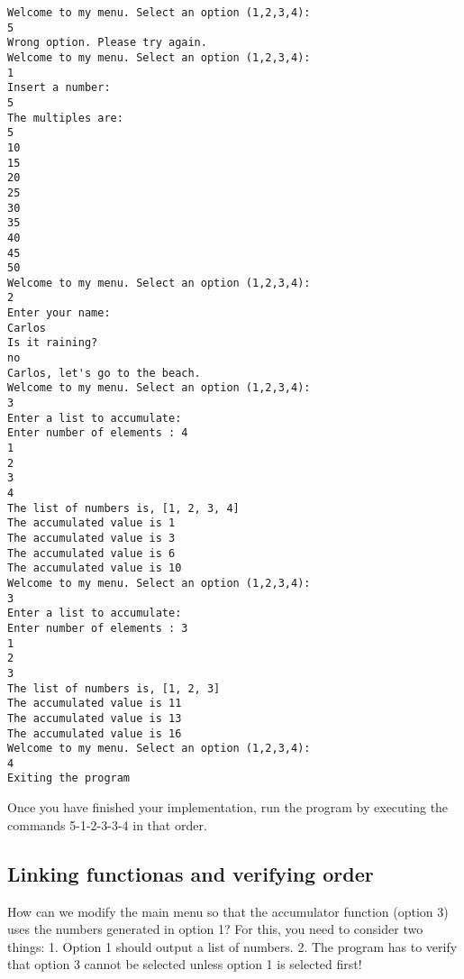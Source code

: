 \documentclass[11pt]{article}
\begin{document}
    \begin{Verbatim}[commandchars=\\\{\}]
Welcome to my menu. Select an option (1,2,3,4):
5
Wrong option. Please try again.
Welcome to my menu. Select an option (1,2,3,4):
1
Insert a number:
5
The multiples are:
5
10
15
20
25
30
35
40
45
50
Welcome to my menu. Select an option (1,2,3,4):
2
Enter your name:
Carlos
Is it raining?
no
Carlos, let's go to the beach.
Welcome to my menu. Select an option (1,2,3,4):
3
Enter a list to accumulate:
Enter number of elements : 4
1
2
3
4
The list of numbers is, [1, 2, 3, 4]
The accumulated value is 1
The accumulated value is 3
The accumulated value is 6
The accumulated value is 10
Welcome to my menu. Select an option (1,2,3,4):
3
Enter a list to accumulate:
Enter number of elements : 3
1
2
3
The list of numbers is, [1, 2, 3]
The accumulated value is 11
The accumulated value is 13
The accumulated value is 16
Welcome to my menu. Select an option (1,2,3,4):
4
Exiting the program

    \end{Verbatim}

    Once you have finished your implementation, run the program by executing
the commands 5-1-2-3-3-4 in that order.

    \hypertarget{linking-functionas-and-verifying-order}{%
\subsection{Linking functionas and verifying
order}\label{linking-functionas-and-verifying-order}}

    How can we modify the main menu so that the accumulator function (option
3) uses the numbers generated in option 1? For this, you need to
consider two things: 1. Option 1 should output a list of numbers. 2. The
program has to verify that option 3 cannot be selected unless option 1
is selected first!
\end{document}
